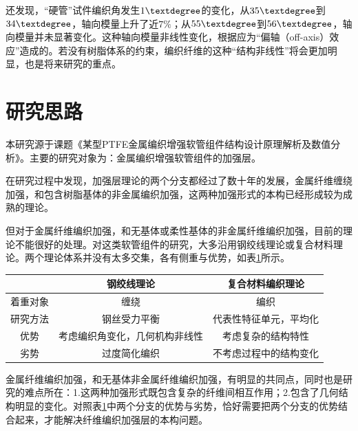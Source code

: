 \citeauthor{Leung2013}还发现，“硬管”试件编织角发生$ 1\textdegree $的变化，从$ 35 \textdegree$到$ 34\textdegree $，轴向模量上升了近$ 7 \% $；从$ 55 \textdegree$到$ 56\textdegree $，轴向模量并未显著变化。这种轴向模量非线性变化，根据\citeauthor{Ishikawa1982}\cite{Ishikawa1982}应为“偏轴（off-axis）效应”造成的。若没有树脂体系的约束，编织纤维的这种“结构非线性”将会更加明显，也是将来研究的重点。









\section{研究思路}
本研究源于课题《某型PTFE金属编织增强软管组件结构设计原理解析及数值分析》。主要的研究对象为：金属编织增强软管组件的加强层。

  在研究过程中发现，加强层理论的两个分支都经过了数十年的发展，金属纤维缠绕加强，和包含树脂基体的非金属编织加强，这两种加强形式的本构已经形成较为成熟的理论\cite{Evans2002}。
  
 但对于金属纤维编织加强，和无基体或柔性基体的非金属纤维编织加强，目前的理论不能很好的处理\cite{Reese2003}。对这类软管组件的研究，大多沿用钢绞线理论或复合材料理论。两个理论体系并没有太多交集，各有侧重与优势，如表\ref{tab:hose-specimen}所示。

\begin{table}[!htb]
	\centering
	\label{tab:hose-specimen}
	\begin{tabular*}{1.0\textwidth}{@{\extracolsep{\fill}}>{\hspace{0.5cm}}ccc}
		\toprule
		&      钢绞线理论      &  复合材料编织理论   \\\midrule
		着重对象 &       缠绕        &     编织      \\
		研究方法 &     钢丝受力平衡      & 代表性特征单元，平均化 \\
		优势   & 考虑编织角变化，几何机构非线性 &  考虑复杂的结构特性  \\
		劣势   &     过度简化编织      & 不考虑过程中的结构变化 \\ \bottomrule
	\end{tabular*} 
\end{table}
  
 金属纤维编织加强，和无基体非金属纤维编织加强，有明显的共同点，同时也是研究的难点所在：1.这两种加强形式既包含复杂的纤维间相互作用；2.包含了几何结构明显的变化。对照表\ref{tab:hose-specimen}中两个分支的优势与劣势，恰好需要把两个分支的优势结合起来，才能解决纤维编织加强层的本构问题。
 
